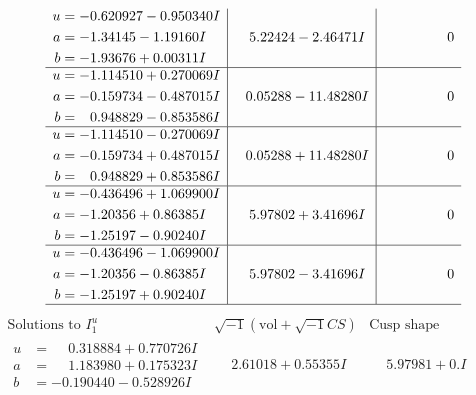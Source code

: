 \documentclass[1p]{elsarticle_modified}
\theoremstyle{definition}
\newcommand{\I}{\sqrt{-1}}
\begin{document}
$$\begin{array}{c|c|c}
\begin{aligned}
u &= -0.620927 - 0.950340 I \\
a &= -1.34145 - 1.19160 I \\
b &= -1.93676 + 0.00311 I\end{aligned}
 & \phantom{-}5.22424 - 2.46471 I & \phantom{-0.000000 } 0 \\ \hline\begin{aligned}
u &= -1.114510 + 0.270069 I \\
a &= -0.159734 - 0.487015 I \\
b &= \phantom{-}0.948829 - 0.853586 I\end{aligned}
 & \phantom{-}0.05288 - 11.48280 I & \phantom{-0.000000 } 0 \\ \hline\begin{aligned}
u &= -1.114510 - 0.270069 I \\
a &= -0.159734 + 0.487015 I \\
b &= \phantom{-}0.948829 + 0.853586 I\end{aligned}
 & \phantom{-}0.05288 + 11.48280 I & \phantom{-0.000000 } 0 \\ \hline\begin{aligned}
u &= -0.436496 + 1.069900 I \\
a &= -1.20356 + 0.86385 I \\
b &= -1.25197 - 0.90240 I\end{aligned}
 & \phantom{-}5.97802 + 3.41696 I & \phantom{-0.000000 } 0 \\ \hline\begin{aligned}
u &= -0.436496 - 1.069900 I \\
a &= -1.20356 - 0.86385 I \\
b &= -1.25197 + 0.90240 I\end{aligned}
 & \phantom{-}5.97802 - 3.41696 I & \phantom{-0.000000 } 0\\
 \hline 
 \end{array}$$\newpage$$\begin{array}{c|c|c}  
\text{Solutions to }I^u_{1}& \I (\text{vol} + \sqrt{-1}CS) & \text{Cusp shape}\\
 \hline 
\begin{aligned}
u &= \phantom{-}0.318884 + 0.770726 I \\
a &= \phantom{-}1.183980 + 0.175323 I \\
b &= -0.190440 - 0.528926 I\end{aligned}
 & \phantom{-}2.61018 + 0.55355 I & \phantom{-}5.97981 + 0. I\phantom{ +0.000000I} \\ \hline\begin{aligned}

\end{aligned}
\end{array}$$
\end{document}
